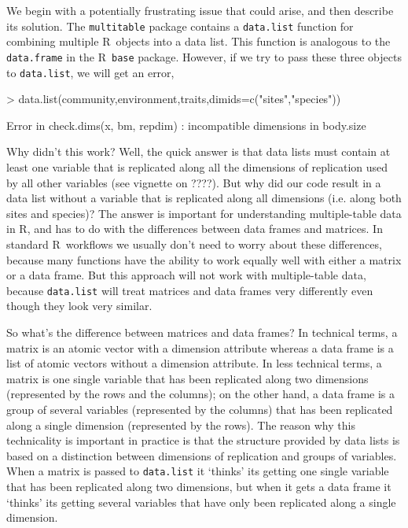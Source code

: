 \documentclass{article}
\newcommand{\R}{{\sf R}}
\newcommand{\code}[1]{\texttt{#1}}
\numberwithin{exercise}{section}
\begin{document}
We begin with a potentially frustrating issue that could arise, and then describe its solution.  The \code{multitable} package contains a \code{data.list} function for combining multiple \R\ objects into a data list.  This function is analogous to the \code{data.frame} in the \R\ \code{base} package.  However, if we try to pass these three objects to \code{data.list}, we will get an error,
\begin{Schunk}
\begin{Sinput}
> data.list(community,environment,traits,dimids=c("sites","species"))
\end{Sinput}
\end{Schunk}
\begin{Schunk}
\begin{Soutput}
Error in check.dims(x, bm, repdim) : incompatible dimensions in body.size
\end{Soutput}
\end{Schunk}

Why didn't this work?  Well, the quick answer is that data lists must contain at least one variable that is replicated along all the dimensions of replication used by all other variables (see vignette on ????).  But why did our code result in a data list without a variable that is replicated along all dimensions (i.e. along both sites and species)?  The answer is important for understanding multiple-table data in \R, and has to do with the differences between data frames and matrices.  In standard \R\ workflows we usually don't need to worry about these differences, because many functions have the ability to work equally well with either a matrix or a data frame.  But this approach will not work with multiple-table data, because \code{data.list} will treat matrices and data frames very differently even though they look very similar.

So what's the difference between matrices and data frames?  In technical terms, a matrix is an atomic vector with a dimension attribute whereas a data frame is a list of atomic vectors without a dimension attribute.  In less technical terms, a matrix is one single variable that has been replicated along two dimensions (represented by the rows and the columns); on the other hand, a data frame is a group of several variables (represented by the columns) that has been replicated along a single dimension (represented by the rows).  The reason why this technicality is important in practice is that the structure provided by data lists is based on a distinction between dimensions of replication and groups of variables.  When a matrix is passed to \code{data.list} it `thinks' its getting one single variable that has been replicated along two dimensions, but when it gets a data frame it `thinks' its getting several variables that have only been replicated along a single dimension.
\end{document}
